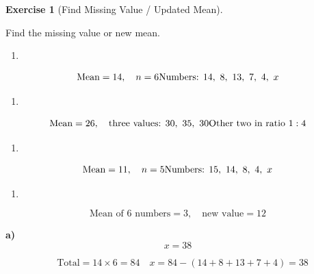 \documentclass[
  letterpaper,
  DIV=11,
  numbers=noendperiod]{scrreprt}
\providecommand{\tightlist}{%
  \setlength{\itemsep}{0pt}\setlength{\parskip}{0pt}}
\theoremstyle{definition}
\newtheorem{exercise}{Exercise}[chapter]
\theoremstyle{remark}
\begin{document}
\begin{exercise}[Find Missing Value / Updated
Mean]\protect\hypertarget{exr-avg-6}{}\label{exr-avg-6}

Find the missing value or new mean.

\begin{enumerate}
\def\labelenumi{\alph{enumi})}
\tightlist
\item
\end{enumerate}

\[\text{Mean} = 14,\quad n=6\\[4pt]\text{Numbers: }14,\ 8,\ 13,\ 7,\ 4,\ x\]

\begin{enumerate}
\def\labelenumi{\alph{enumi})}
\setcounter{enumi}{1}
\tightlist
\item
\end{enumerate}

\[\text{Mean} = 26,\quad\text{three values: }30,\ 35,\ 30\\[4pt]\text{Other two in ratio }1:4\]

\begin{enumerate}
\def\labelenumi{\alph{enumi})}
\setcounter{enumi}{2}
\tightlist
\item
\end{enumerate}

\[\text{Mean} = 11,\quad n=5\\[4pt]\text{Numbers: }15,\ 14,\ 8,\ 4,\ x\]

\begin{enumerate}
\def\labelenumi{\alph{enumi})}
\setcounter{enumi}{3}
\tightlist
\item
\end{enumerate}

\[\text{Mean of }6\text{ numbers} = 3,\quad\text{new value} = 12\]

\begin{tcolorbox}[enhanced jigsaw, opacitybacktitle=0.6, coltitle=black, arc=.35mm, colframe=quarto-callout-tip-color-frame, colback=white, bottomrule=.15mm, left=2mm, colbacktitle=quarto-callout-tip-color!10!white, titlerule=0mm, opacityback=0, title=\textcolor{quarto-callout-tip-color}{\faLightbulb}\hspace{0.5em}{🔍 View Solution}, leftrule=.75mm, breakable, rightrule=.15mm, bottomtitle=1mm, toptitle=1mm, toprule=.15mm]

\textbf{a)} \[x = 38\]

\[\quad \text{Total} = 14\times6=84\quad x = 84-(14+8+13+7+4) = 38\]


\end{tcolorbox}
\end{exercise}
\end{document}
